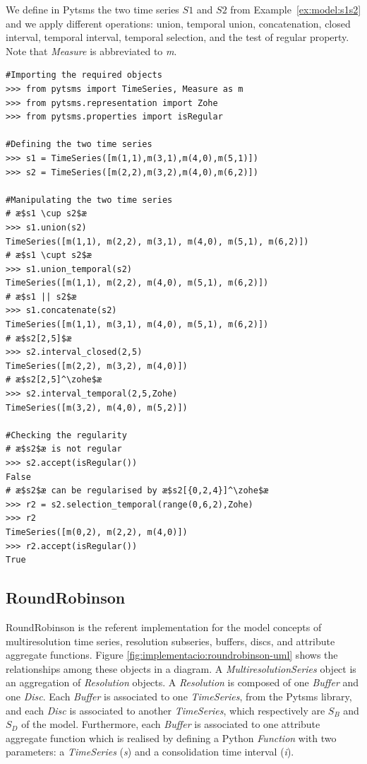 \begin{example}
  \label{ex:pytsms:example}
  We define in Pytsms the two time series $S1$ and $S2$ from
  Example~\ref{ex:model:s1s2} and we apply different operations:
  union, temporal union, concatenation, closed interval, \zohe{}
  temporal interval, \zohe{} temporal selection, and the test of
  regular property. Note that \emph{Measure} is abbreviated to
  \emph{m}.
\begin{lstlisting}[style=py]
#Importing the required objects
>>> from pytsms import TimeSeries, Measure as m
>>> from pytsms.representation import Zohe
>>> from pytsms.properties import isRegular

#Defining the two time series
>>> s1 = TimeSeries([m(1,1),m(3,1),m(4,0),m(5,1)])
>>> s2 = TimeSeries([m(2,2),m(3,2),m(4,0),m(6,2)])

#Manipulating the two time series
# æ$s1 \cup s2$æ
>>> s1.union(s2)
TimeSeries([m(1,1), m(2,2), m(3,1), m(4,0), m(5,1), m(6,2)])
# æ$s1 \cupt s2$æ
>>> s1.union_temporal(s2)
TimeSeries([m(1,1), m(2,2), m(4,0), m(5,1), m(6,2)])
# æ$s1 || s2$æ
>>> s1.concatenate(s2) 
TimeSeries([m(1,1), m(3,1), m(4,0), m(5,1), m(6,2)])
# æ$s2[2,5]$æ
>>> s2.interval_closed(2,5)
TimeSeries([m(2,2), m(3,2), m(4,0)])
# æ$s2[2,5]^\zohe$æ
>>> s2.interval_temporal(2,5,Zohe)
TimeSeries([m(3,2), m(4,0), m(5,2)])

#Checking the regularity
# æ$s2$æ is not regular
>>> s2.accept(isRegular())
False
# æ$s2$æ can be regularised by æ$s2[{0,2,4}]^\zohe$æ
>>> r2 = s2.selection_temporal(range(0,6,2),Zohe)
>>> r2
TimeSeries([m(0,2), m(2,2), m(4,0)])
>>> r2.accept(isRegular())
True
\end{lstlisting}
\end{example}





\subsection{RoundRobinson}


RoundRobinson is the referent implementation for the model concepts of
multiresolution time series, resolution subseries, buffers, discs, and
attribute aggregate functions. Figure
\ref{fig:implementacio:roundrobinson-uml} shows the relationships
among these objects in a  diagram. A
\emph{MultiresolutionSeries} object is an aggregation of
\emph{Resolution} objects. A \emph{Resolution} is composed of one
\emph{Buffer} and one \emph{Disc}. Each \emph{Buffer} is associated to
one \emph{TimeSeries}, from the Pytsms library, and each \emph{Disc}
is associated to another \emph{TimeSeries}, which respectively are
$S_B$ and $S_D$ of the  model. Furthermore, each
\emph{Buffer} is associated to one attribute aggregate function which
is realised by defining a Python \emph{Function} with two parameters:
a \emph{TimeSeries} (\emph{s}) and a consolidation time interval
(\emph{i}).



